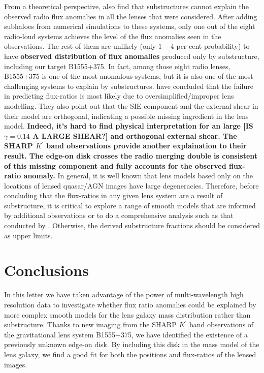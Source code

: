 \documentclass[useAMS,usenatbib]{mn2e}
\begin{document}
From a theoretical perspective, \citet{Xu14} also find that substructures
cannot explain the observed radio flux anomalies in all the lenses
that were considered. After adding subhaloes from numerical simulations
to these systems, only one out of the eight radio-loud systems
achieves the level of the flux anomalies seen in the observations.  The rest of
them are unlikely (only $1 - 4$ per cent probability) to have \textbf{observed distribution of flux
anomalies} produced only by substructure, including our target B1555+375.
In fact, among those eight radio lenses, B1555+375 is one of the most
anomalous systems, but it is also one of the most challenging systems
to explain by substructures. \citet{Xu14} have concluded that the failure in
predicting flux-ratios is most likely due to oversimplified/improper lens
modelling. They also point out that the SIE component and the external
shear in their model are orthogonal, indicating a possible missing
ingredient in the lens model.
\textbf{Indeed, it's hard to find physical interpretation for an large [IS $\gamma = 0.14$ A LARGE SHEAR?] and orthogonal external shear.
The SHARP $K^{\prime}$ band observations provide another explaination to their result. The edge-on disk crosses the
radio merging double is consistent of this missing component and fully accounts for the observed flux-ratio anomaly.} 
In general, it is well known  \citep[e.g,][]{Ka91} that lens models based only on the locations of lensed
quasar/AGN images have large degeneracies. Therefore, before
concluding that the flux-ratios in any given lens system are a result
of substructure, it is critical to explore a range of smooth models
that are informed by additional observations or to do a comprehensive
analysis such as that conducted by \citet{Xu14}. Otherwise, the derived
substructure fractions should be considered as upper limits.
 

\section{Conclusions}
In this letter we have taken advantage of the power of
multi-wavelength high resolution data to investigate whether flux
ratio anomalies could be explained by more complex smooth models for
the lens galaxy mass distribution rather than substructure. Thanks to
new imaging from the SHARP $K^{\prime}$ band observations of the
gravitational lens system B1555+375, we have identified the existence
of a previously unknown edge-on disk. By including this disk in the
mass model of the lens galaxy, we find a good fit for both the
positions and flux-ratios of the lensed images. 
\end{document}
